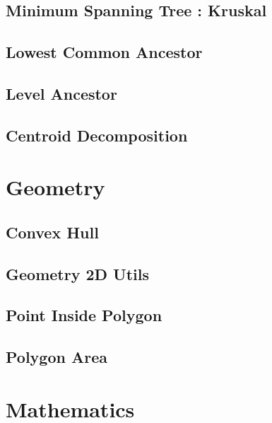 \documentclass[10pt,landscape,twocolumn,a4paper,notitlepage]{article}
\begin{document}
  \subsection{Minimum Spanning Tree : Kruskal}
  

  \subsection{Lowest Common Ancestor}
  

  \subsection{Level Ancestor}
  

  \subsection{Centroid Decomposition}
  

\section{Geometry}

  \subsection{Convex Hull}
  

  \subsection{Geometry 2D Utils}
  

  \subsection{Point Inside Polygon}
  

  \subsection{Polygon Area}
  

\section{Mathematics}
\end{document}
